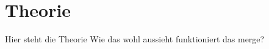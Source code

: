 \section{Theorie}
\label{sec:Theorie}
Hier steht die Theorie
Wie das wohl aussieht
funktioniert das merge?
